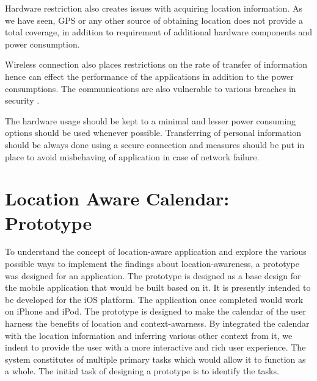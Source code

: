 \documentclass[12pt]{report}
\begin{document}
Hardware restriction also creates issues with acquiring location information. As we have seen, GPS or any other source of obtaining location does not provide a total coverage, in addition to requirement of additional hardware components and power consumption.

Wireless connection also places restrictions on the rate of transfer of information hence can effect the performance of the applications in addition to the power consumptions. The communications are also vulnerable to various breaches in security \cite{patterson2003challenges}.

The hardware usage should be kept to a minimal and lesser power consuming options should be used whenever possible. Transferring of personal information should be always done using a secure connection and measures should be put in place to avoid misbehaving of application in case of network failure.

\chapter{Location Aware Calendar: Prototype}
To understand the concept of location-aware application and explore the various possible ways to implement the findings about location-awareness, a prototype was designed for an application. The prototype is designed as a base design for the mobile application that would be built based on it. It is presently intended to be developed for the iOS platform. The application once completed would work on iPhone and iPod. The prototype is designed to make the calendar of the user harness the benefits of location and context-awarness. By integrated the calendar with the location information and inferring various other context from it, we indent to provide the user with a more interactive and rich user experience. The system constitutes of multiple primary tasks which would allow it to function as a whole. The initial task of designing a prototype is to identify the tasks.
\end{document}
